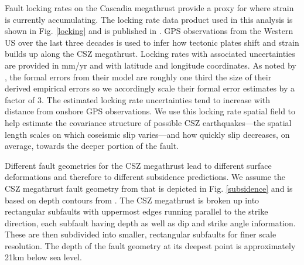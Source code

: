 {Fault locking rates on the Cascadia megathrust provide a proxy for where strain is currently accumulating.  The locking rate data product used in this analysis is shown in Fig. \ref{locking} and is published in \citet{pollitz2017}.  GPS observations from the Western US over the last three decades is used to infer how tectonic plates shift and strain builds up along the CSZ megathrust.  Locking rates with associated uncertainties are provided in mm/yr and with latitude and longitude coordinates.  As noted by \citet{pollitz2017}, the formal errors from their model are roughly one third the size of their derived empirical errors so we accordingly scale their formal error estimates by a factor of 3.  The estimated locking rate uncertainties tend to increase with distance from onshore GPS observations.  We use this locking rate spatial field to help estimate the covariance structure of possible CSZ earthquakes---the spatial length scales on which coseismic slip varies---and how quickly slip decreases, on average, towards the deeper portion of the fault.

Different fault geometries for the CSZ megathrust lead to different surface deformations and therefore to different subsidence predictions.  We assume the CSZ megathrust fault geometry from \citet{faultGeom} that is depicted in Fig. \ref{subsidence} and is based on depth contours from \citet{faultGeom2}.  The CSZ megathrust is broken up into rectangular subfaults with uppermost edges running parallel to the strike direction, each subfault having depth as well as dip and strike angle information.  These are then subdivided into smaller, rectangular subfaults for finer scale resolution.  The depth of the fault geometry at its deepest point is approximately 21km below sea level.

}
